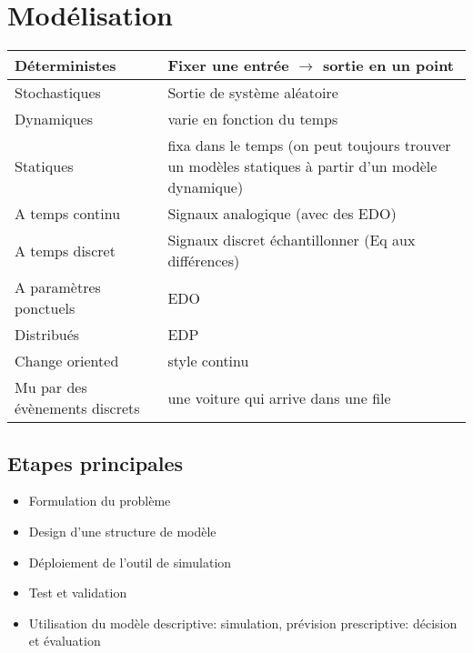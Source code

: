 \documentclass[resume]{subfiles}
\begin{document}
\section{Modélisation}
\begin{table}[H]
\centering
    \begin{tabular}{|l|l|}
    \hline
Déterministes                  & Fixer une entrée $\rightarrow$ sortie en un point \\
\hline
Stochastiques                  & Sortie de système aléatoire\\
\hline
Dynamiques                     & varie en fonction du temps\\
\hline
Statiques                      & fixa dans le temps (on peut toujours trouver un 
modèles statiques à partir d'un modèle dynamique)\\
\hline
A temps continu                & Signaux analogique (avec des EDO)\\
\hline
A temps discret                & Signaux discret échantillonner (Eq aux 
différences)\\
\hline
A paramètres ponctuels         & EDO\\
\hline
Distribués                     & EDP\\
\hline
Change oriented                & style continu\\
\hline
Mu par des évènements discrets & une voiture qui arrive dans une file\\
 \hline
    \end{tabular}
\end{table}

\subsection{Etapes principales}
\begin{itemize}
\item Formulation du problème
\item Design d'une structure de modèle
\item Déploiement de l'outil de simulation
\item Test et validation
\item Utilisation du modèle
\subitem descriptive: simulation, prévision
\subitem prescriptive: décision et évaluation  
\end{itemize}
\end{document}
